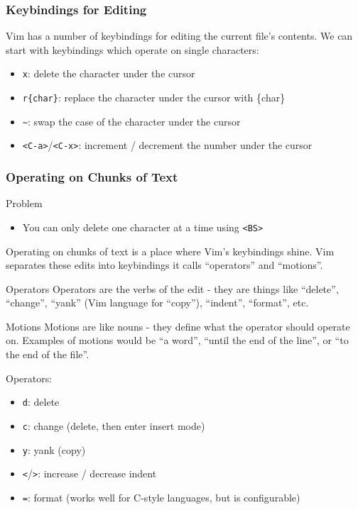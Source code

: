 \documentclass{beamer}
\begin{document}
\begin{frame}[fragile]
    \frametitle{Keybindings for Editing}
    \small
    Vim has a number of keybindings for editing the current file's contents. We can start with keybindings which operate on single characters:
    \begin{itemize}
	\item \verb+x+:  delete the character under the cursor
	\item \verb+r{char}+:  replace the character under the cursor with \{char\}
	\item \verb+~+:  swap the case of the character under the cursor
	\item \verb+<C-a>+/\verb+<C-x>+:  increment / decrement the number under the cursor
    \end{itemize}
\end{frame}

\begin{frame}[fragile]
    \frametitle{Operating on Chunks of Text}
    \small
    \begin{block}{Problem}
	\begin{itemize}
	    \item You can only delete one character at a time using \verb+<BS>+
	\end{itemize}
    \end{block}
    Operating on chunks of text is a place where Vim's keybindings shine. Vim separates these edits into keybindings it calls \enquote{operators} and \enquote{motions}.
    \begin{block}{Operators}
	Operators are the verbs of the edit - they are things like \enquote{delete}, \enquote{change}, \enquote{yank} (Vim language for \enquote{copy}), \enquote{indent}, \enquote{format}, etc.
    \end{block}
    \begin{block}{Motions}
	Motions are like nouns - they define what the operator should operate on. Examples of motions would be \enquote{a word}, \enquote{until the end of the line}, or \enquote{to the end of the file}.
    \end{block}
\end{frame}

\begin{frame}[fragile]
    \small
    Operators:
    \begin{itemize}
	\item \verb+d+:  delete
	\item \verb+c+:  change (delete, then enter insert mode)
	\item \verb+y+:  yank (copy)
	\item \verb+<+/\verb+>+:  increase / decrease indent
	\item \verb+=+:  format (works well for C-style languages, but is configurable)
    \end{itemize}
\end{frame}
\end{document}
